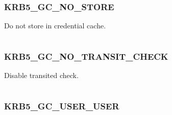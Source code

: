 \documentclass[letterpaper,10pt,english]{sphinxmanual}
\begin{document}
\subsubsection{KRB5\_GC\_NO\_STORE}
\label{appdev/refs/macros/KRB5_GC_NO_STORE::doc}\label{appdev/refs/macros/KRB5_GC_NO_STORE:krb5-gc-no-store}\label{appdev/refs/macros/KRB5_GC_NO_STORE:krb5-gc-no-store-data}

\begin{fulllineitems}
\label{appdev/refs/macros/KRB5_GC_NO_STORE:KRB5_GC_NO_STORE}
\end{fulllineitems}


Do not store in credential cache.

\begin{tabulary}{\linewidth}{|L|L|}
\hline

 & 
\\
\hline\end{tabulary}



\subsubsection{KRB5\_GC\_NO\_TRANSIT\_CHECK}
\label{appdev/refs/macros/KRB5_GC_NO_TRANSIT_CHECK:krb5-gc-no-transit-check-data}\label{appdev/refs/macros/KRB5_GC_NO_TRANSIT_CHECK:krb5-gc-no-transit-check}\label{appdev/refs/macros/KRB5_GC_NO_TRANSIT_CHECK::doc}

\begin{fulllineitems}
\label{appdev/refs/macros/KRB5_GC_NO_TRANSIT_CHECK:KRB5_GC_NO_TRANSIT_CHECK}
\end{fulllineitems}


Disable transited check.

\begin{tabulary}{\linewidth}{|L|L|}
\hline

 & 
\\
\hline\end{tabulary}



\subsubsection{KRB5\_GC\_USER\_USER}
\label{appdev/refs/macros/KRB5_GC_USER_USER::doc}\label{appdev/refs/macros/KRB5_GC_USER_USER:krb5-gc-user-user}\label{appdev/refs/macros/KRB5_GC_USER_USER:krb5-gc-user-user-data}
\end{document}
